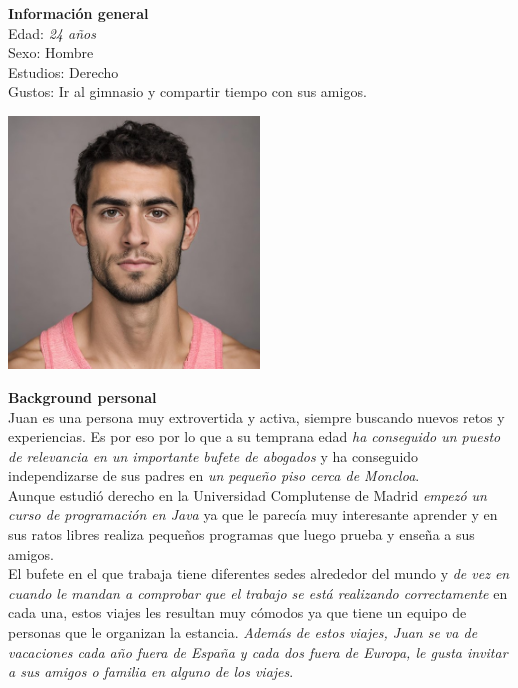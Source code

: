 \begin{minipage}{0.4\textwidth}
    \textbf{Información general} \\

    Edad: \textit{24 años} \\
    Sexo: Hombre \\
    Estudios: Derecho \\
    Gustos: Ir al gimnasio y compartir tiempo con sus amigos. \\
\end{minipage}
\hfill
\begin{minipage}{0.4\textwidth}
    \includegraphics[width=0.5\textwidth]{Imagenes/Personas/Juan.jpg}
\end{minipage}

\textbf{Background personal} \\

Juan es una persona muy extrovertida y activa, siempre buscando nuevos retos y experiencias. Es por eso por lo que a su temprana edad \textit{ha conseguido un puesto de relevancia en un importante bufete de abogados} y ha conseguido independizarse de sus padres en \textit{un pequeño piso cerca de Moncloa}. \\

Aunque estudió derecho en la Universidad Complutense de Madrid \textit{empezó un curso de programación en Java} ya que le parecía muy interesante aprender y en sus ratos libres realiza pequeños programas que luego prueba y enseña a sus amigos. \\

El bufete en el que trabaja tiene diferentes sedes alrededor del mundo y \textit{de vez en cuando le mandan a comprobar que el trabajo se está realizando correctamente} en cada una, estos viajes les resultan muy cómodos ya que tiene un equipo de personas que le organizan la estancia. \textit{Además de estos viajes, Juan se va de vacaciones cada año fuera de España y cada dos fuera de Europa, le gusta invitar a sus amigos o familia en alguno de los viajes}. \\

